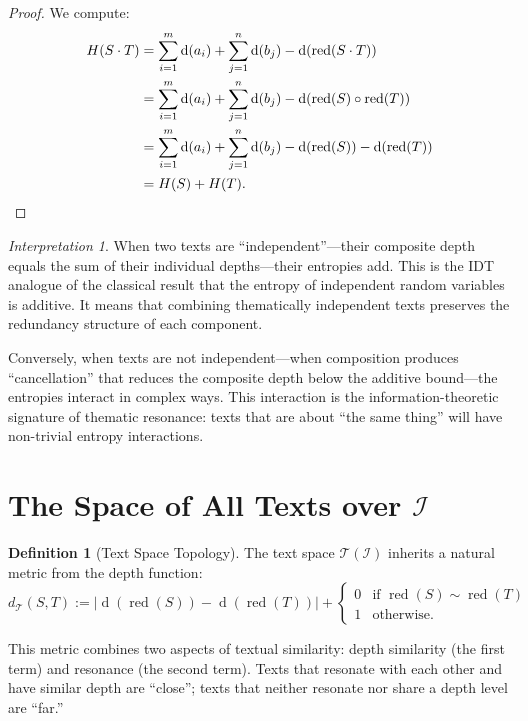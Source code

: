 \documentclass[11pt,openany]{book}
\theoremstyle{definition}
\newtheorem{definition}[axiom]{Definition}
\theoremstyle{plain}
\theoremstyle{remark}
\newtheorem{interpretation}[axiom]{Interpretation}
\newcommand{\IS}{\mathcal{I}}               %
\newcommand{\compose}{\circ}                 %
\newcommand{\res}{\sim}                      %
\newcommand{\depth}{\operatorname{d}}       %
\begin{document}
\begin{proof}
We compute:
\begin{align*}
H(S \cdot T) &= \sum_{i=1}^{m} \depth(a_i) + \sum_{j=1}^{n} \depth(b_j) - \depth(\operatorname{red}(S \cdot T)) \\
&= \sum_{i=1}^{m} \depth(a_i) + \sum_{j=1}^{n} \depth(b_j) - \depth(\operatorname{red}(S) \compose \operatorname{red}(T)) \\
&= \sum_{i=1}^{m} \depth(a_i) + \sum_{j=1}^{n} \depth(b_j) - \depth(\operatorname{red}(S)) - \depth(\operatorname{red}(T)) \\
&= H(S) + H(T). \qedhere
\end{align*}
\end{proof}

\begin{interpretation}
When two texts are ``independent''---their composite depth equals the sum of their individual depths---their entropies add. This is the IDT analogue of the classical result that the entropy of independent random variables is additive. It means that combining thematically independent texts preserves the redundancy structure of each component.

Conversely, when texts are not independent---when composition produces ``cancellation'' that reduces the composite depth below the additive bound---the entropies interact in complex ways. This interaction is the information-theoretic signature of thematic resonance: texts that are about ``the same thing'' will have non-trivial entropy interactions.
\end{interpretation}

\section{The Space of All Texts over $\IS$}

\begin{definition}[Text Space Topology]
The text space $\mathcal{T}(\IS)$ inherits a natural metric from the depth function:
\[
d_{\mathcal{T}}(S, T) := |\depth(\operatorname{red}(S)) - \depth(\operatorname{red}(T))| + \begin{cases} 0 & \text{if } \operatorname{red}(S) \res \operatorname{red}(T) \\ 1 & \text{otherwise.} \end{cases}
\]
\end{definition}

This metric combines two aspects of textual similarity: depth similarity (the first term) and resonance (the second term). Texts that resonate with each other and have similar depth are ``close''; texts that neither resonate nor share a depth level are ``far.''
\end{document}
